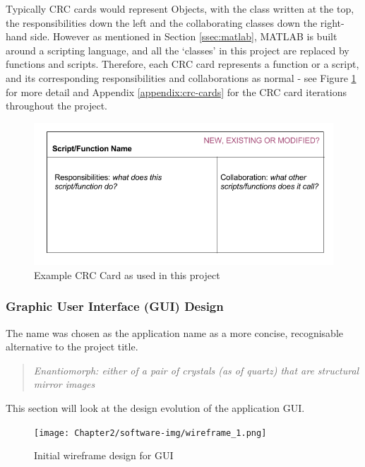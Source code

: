 Typically \acrshort{CRC} cards would represent Objects, with the class written at the top, the responsibilities down the left and the collaborating classes down the right-hand side. However as mentioned in Section \ref{ssec:matlab}, MATLAB is built around a scripting language, and all the `classes' in this project are replaced by functions and scripts. Therefore, each \acrshort{CRC} card represents a function or a script, and its corresponding responsibilities and collaborations as normal - see Figure \ref{fig:crc} for more detail and Appendix \ref{appendix:crc-cards} for the \acrshort{CRC} card iterations throughout the project.

\begin{figure}[H]
  \center
  \includegraphics[scale=0.5]{Chapter2/software-img/crc.png}
  \caption{Example CRC Card as used in this project}
  \label{fig:crc}
\end{figure}

\subsubsection{Graphic User Interface (GUI) Design}
\label{sssec:gui-design}

The name  was chosen as the application name as a more concise, recognisable alternative to the project title.

\begin{quotation}
  \textit{Enantiomorph: either of a pair of crystals (as of quartz) that are structural mirror images \cite{enantiomorph}}
\end{quotation}

This section will look at the design evolution of the application \acrfull{GUI}.

\begin{figure}[H]
  \center
  \texttt{[image: Chapter2/software-img/wireframe\_1.png]}
  \caption{Initial wireframe design for \acrshort{GUI}}
  \label{fig:wireframe1}
\end{figure}


